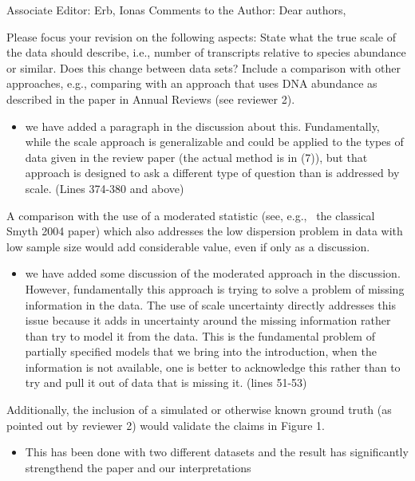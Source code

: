 \documentclass[
]{article}
\providecommand{\tightlist}{%
  \setlength{\itemsep}{0pt}\setlength{\parskip}{0pt}}
\begin{document}
Associate Editor: Erb, Ionas Comments to the Author: Dear authors,

Please focus your revision on the following aspects: State what the true
scale of the data should describe, i.e., number of transcripts relative
to species abundance or similar. Does this change between data sets?
Include a comparison with other approaches, e.g., comparing with an
approach that uses DNA abundance as described in the paper in Annual
Reviews (see reviewer 2).

\begin{itemize}
\tightlist
\item
  we have added a paragraph in the discussion about this. Fundamentally,
  while the scale approach is generalizable and could be applied to the
  types of data given in the review paper (the actual method is in (7)),
  but that approach is designed to ask a different type of question than
  is addressed by scale. (Lines 374-380 and above)
\end{itemize}

A comparison with the use of a moderated statistic (see, e.g., ~the
classical Smyth 2004 paper) which also addresses the low dispersion
problem in data with low sample size would add considerable value, even
if only as a discussion.

\begin{itemize}
\tightlist
\item
  we have added some discussion of the moderated approach in the
  discussion. However, fundamentally this approach is trying to solve a
  problem of missing information in the data. The use of scale
  uncertainty directly addresses this issue because it adds in
  uncertainty around the missing information rather than try to model it
  from the data. This is the fundamental problem of partially specified
  models that we bring into the introduction, when the information is
  not available, one is better to acknowledge this rather than to try
  and pull it out of data that is missing it. (lines 51-53)
\end{itemize}

Additionally, the inclusion of a simulated or otherwise known ground
truth (as pointed out by reviewer 2) would validate the claims in Figure
1.

\begin{itemize}
\tightlist
\item
  This has been done with two different datasets and the result has
  significantly strengthend the paper and our interpretations
\end{itemize}
\end{document}

